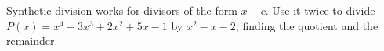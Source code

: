 Synthetic division works for divisors of the form $x-c$. Use it twice to divide $P(x)=x^4-3x^3+2x^2+5x-1$ by $x^2-x-2$, finding the quotient and the remainder.
